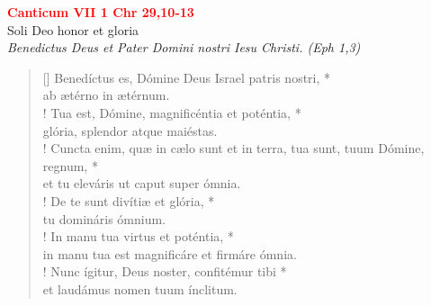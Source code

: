 


\def\greinitialformat#1{%
{\fontsize{39}{39}\selectfont #1}%
}




\vspace{0.3cm}
\begin{center}
 \textcolor{red}{\large \bf Canticum VII 1 Chr 29,10-13}\\
Soli Deo honor et gloria\\
\textit{\small Benedictus Deus et Pater Domini nostri Iesu Christi. (Eph 1,3)}
\end{center}
\begin{verse}[\versewidth]
Benedíctus es, Dómine Deus Israel patris nostri, *\\
ab ætérno in ætérnum.\\!
\vin Tua est, Dómine, magnificéntia et poténtia, *\\
\vin glória, splendor atque maiéstas.\\!
Cuncta enim, quæ in cælo sunt et in terra, tua sunt, tuum Dómine, regnum, *\\
et tu eleváris ut caput super ómnia.\\!
\vin De te sunt divítiæ et glória, *\\
\vin tu domináris ómnium.\\!
In manu tua virtus et poténtia, *\\
in manu tua est magnificáre et firmáre ómnia.\\!
\vin Nunc ígitur, Deus noster, confitémur tibi *\\
\vin et laudámus nomen tuum ínclitum.\\
\end{verse}
\vspace{1cm}


